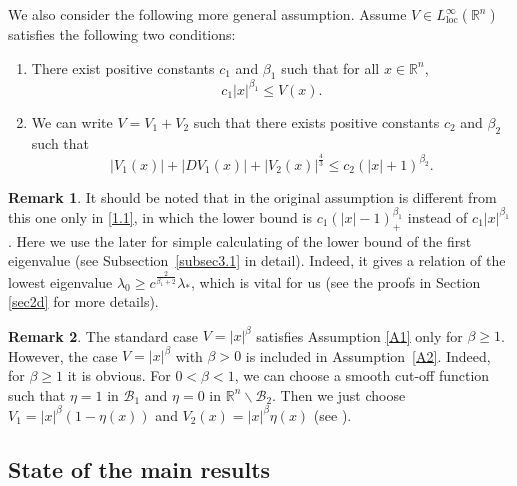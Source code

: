 \documentclass{article}
\numberwithin{equation}{section}
\newcommand\R{\ensuremath{\mathbb{R}}}
\numberwithin{equation}{section}
\newenvironment{taggedtheorem}[1]
 {\renewcommand\thetaggedtheoremx{#1}\taggedtheoremx}
 {\endtaggedtheoremx}
\theoremstyle{definition}
\newtheorem{remark}{Remark}[section]
\begin{document}
We also consider the following more general assumption.
\begin{taggedtheorem}{A2}\label{A2}
Assume $V\in L_{\mathrm{loc}}^{\infty}(\R^{n})$ satisfies the following	two conditions:
\begin{enumerate}
	\item There exist positive constants $c_1$ and $\beta_1$ such that for all $x\in \R^{n}$,
		\begin{equation}
			c_1 |x|^{\beta_1}\le V(x).\label{1.1}
		\end{equation}
	\item We can write $V=V_1+V_2$ such that there exists positive constants $c_2$ and $\beta_2$ such that 
		\begin{equation}
			|V_1(x)|+|DV_1(x)|+|V_2(x)|^{\frac{4}{3}}\le c_2(|x|+1)^{\beta_2}.
		\end{equation}
\end{enumerate}
\end{taggedtheorem}
\begin{remark}It should be noted that in \cite{zhu2023spectral} the original assumption is different from this one only in \eqref{1.1}, in which the lower bound is $c_1\left( |x|-1 \right)_+^{\beta_1}$ instead of $c_1|x|^{\beta_1}$. Here we use the later for simple calculating of the lower bound of the first eigenvalue (see Subsection~\ref{subsec3.1} in detail). Indeed, it gives a relation of the lowest eigenvalue $\lambda_0\ge c^{\frac{2}{\beta_1+2}}\lambda_*$, which is vital for us (see the proofs in Section \ref{sec2d} for more details).
\end{remark}

\begin{remark}\label{r1.2}
The standard case $V=|x|^{\beta}$ satisfies Assumption \ref{A1} only for $\beta \ge 1$. However, the case $V=|x|^{\beta}$ with $\beta >0$ is included in Assumption~\ref{A2}. Indeed, for $\beta \ge 1$ it is obvious. For $0<\beta <1$, we can choose a smooth cut-off function such that $\eta =1$ in $\mathcal{B}_1$ and $\eta =0$ in $\R^{n} \backslash \mathcal{B}_2$. Then we just choose $V_1=|x|^{\beta}(1-\eta (x))$ and $V_2(x)=|x|^{\beta}\eta (x)$ (see \cite[Corollary~1]{zhu2023spectral}). 
\end{remark}

\subsection{State of the main results}
\end{document}
